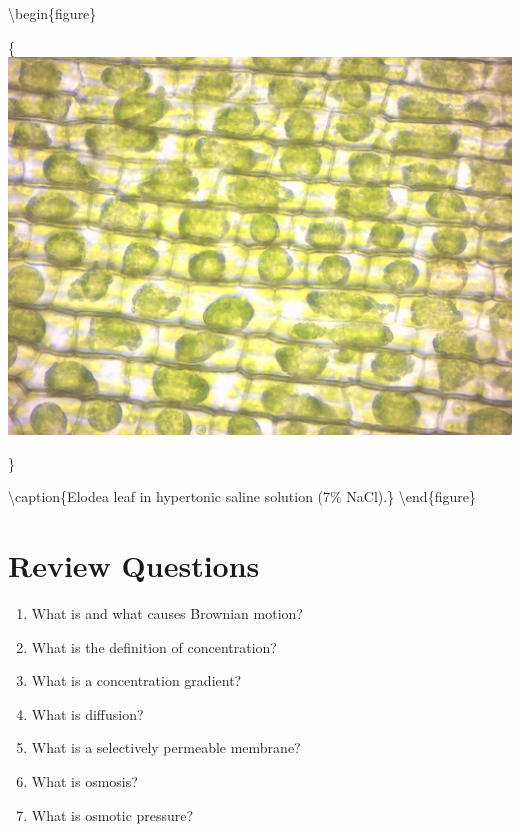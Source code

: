 \textbackslash{}begin\{figure\}

\{\centering \includegraphics[width=0.7\linewidth]{./figures/exchange/elodea_plasmolysis}

\}

\textbackslash{}caption\{Elodea leaf in hypertonic saline solution (7\%
NaCl).\}\label{fig:plasmolysis} \textbackslash{}end\{figure\}

\section{Review Questions}\label{review-questions-3}

\begin{enumerate}
\def\labelenumi{\arabic{enumi}.}
\tightlist
\item
  What is and what causes Brownian motion?
\item
  What is the definition of concentration?
\item
  What is a concentration gradient?
\item
  What is diffusion?
\item
  What is a selectively permeable membrane?
\item
  What is osmosis?
\item
  What is osmotic pressure?
\end{enumerate}



